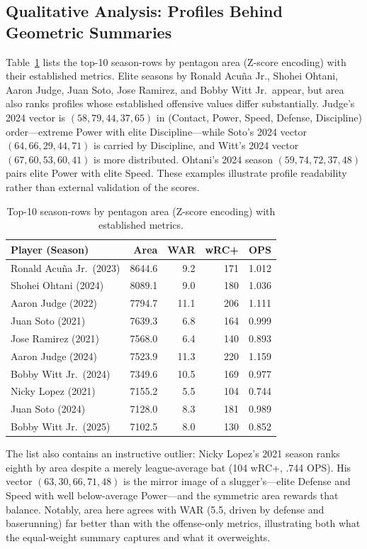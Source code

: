 \documentclass[10pt,twocolumn,letterpaper]{article}
\begin{document}
\subsection{Qualitative Analysis: Profiles Behind Geometric Summaries}
Table~\ref{tab:top10} lists the top-10 season-rows by pentagon area (Z-score encoding) with their established metrics. Elite seasons by Ronald Acu\~na Jr., Shohei Ohtani, Aaron Judge, Juan Soto, Jose Ramirez, and Bobby Witt Jr.\ appear, but area also ranks profiles whose established offensive values differ substantially. Judge's 2024 vector is $(58, 79, 44, 37, 65)$ in (Contact, Power, Speed, Defense, Discipline) order---extreme Power with elite Discipline---while Soto's 2024 vector $(64, 66, 29, 44, 71)$ is carried by Discipline, and Witt's 2024 vector $(67, 60, 53, 60, 41)$ is more distributed. Ohtani's 2024 season $(59, 74, 72, 37, 48)$ pairs elite Power with elite Speed. These examples illustrate profile readability rather than external validation of the scores.

\begin{table}[t]
\centering
\caption{Top-10 season-rows by pentagon area (Z-score encoding) with established metrics.}
\label{tab:top10}
\scriptsize
\setlength{\tabcolsep}{3pt}
\begin{tabular}{lrrrr}
\toprule
Player (Season) & Area & WAR & wRC+ & OPS \\
\midrule
Ronald Acu\~na Jr.\ (2023) & 8644.6 &  9.2 & 171 & 1.012 \\
Shohei Ohtani (2024)       & 8089.1 &  9.0 & 180 & 1.036 \\
Aaron Judge (2022)         & 7794.7 & 11.1 & 206 & 1.111 \\
Juan Soto (2021)           & 7639.3 &  6.8 & 164 & 0.999 \\
Jose Ramirez (2021)        & 7568.0 &  6.4 & 140 & 0.893 \\
Aaron Judge (2024)         & 7523.9 & 11.3 & 220 & 1.159 \\
Bobby Witt Jr.\ (2024)     & 7349.6 & 10.5 & 169 & 0.977 \\
Nicky Lopez (2021)         & 7155.2 &  5.5 & 104 & 0.744 \\
Juan Soto (2024)           & 7128.0 &  8.3 & 181 & 0.989 \\
Bobby Witt Jr.\ (2025)     & 7102.5 &  8.0 & 130 & 0.852 \\
\bottomrule
\end{tabular}
\end{table}

The list also contains an instructive outlier: Nicky Lopez's 2021 season ranks eighth by area despite a merely league-average bat (104 wRC+, .744 OPS). His vector $(63, 30, 66, 71, 48)$ is the mirror image of a slugger's---elite Defense and Speed with well below-average Power---and the symmetric area rewards that balance. Notably, area here agrees with WAR (5.5, driven by defense and baserunning) far better than with the offense-only metrics, illustrating both what the equal-weight summary captures and what it overweights.
\end{document}
